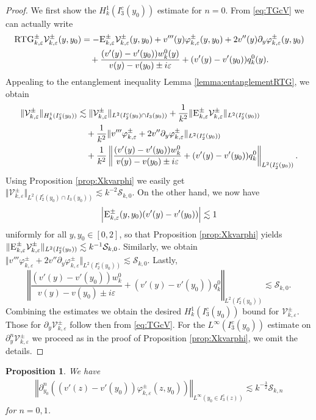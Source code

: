 \documentclass[11pt,reqno]{amsproc}
\newtheorem{proposition}{Proposition}[section]
\theoremstyle{definition}
\numberwithin{equation}{section}
\newcommand{\cS}{{\mathcal S}}
\newcommand{\cV}{{\mathcal{V}}}
\newcommand{\ep}{\varepsilon}
\begin{document}
\begin{proof}
We first show the $H_k^1(I_3^c(y_0))$ estimate for $n=0$. From \eqref{eq:TGcV} we can actually write
\begin{align*}
\textsc{RTG}_{k,\ep}^\pm \cV_{k,\ep}^\pm(y,y_0) &= - \textsc{E}_{k,\ep}^\pm \cV_{k,\ep}^\pm(y,y_0) + v'''(y)\varphi_{k,\ep}^\pm(y,y_0) + 2 v''(y) \partial_y\varphi_{k,\ep}^\pm(y,y_0) \\
&\quad+ \frac{(v'(y) - v'(y_0)) w_k^0(y)}{v(y) - v(y_0) \pm i\ep} + (v'(y) - v'(y_0)) q_k^0(y).
\end{align*}
Appealing to the entanglement inequality Lemma \ref{lemma:entanglementRTG}, we obtain
\begin{align*}
 \Vert \cV_{k,\ep}^\pm \Vert_{H_k^1(I_3^c(y_0))} &\lesssim \Vert \cV_{k,\ep}^\pm \Vert_{L^2(I_2^c(y_0)\cap I_3(y_0))} + \frac{1}{k^2}\Vert \textsc{E}_{k,\ep}^\pm \cV_{k,\ep}^\pm \Vert_{L^2(I_2^c(y_0))}\\
 &\quad + \frac{1}{k^2}\Vert v'''\varphi_{k,\ep}^\pm + 2 v'' \partial_y\varphi_{k,\ep}^\pm \Vert_{L^2(I_2^c(y_0))} \\
 &\quad + \frac{1}{k^2}\left \Vert \frac{(v'(y) - v'(y_0)) w_k^0}{v(y) - v(y_0) \pm i\ep} + (v'(y) - v'(y_0)) q_k^0\right\Vert_{L^2(I_2^c(y_0))}.
\end{align*}
Using Proposition \ref{prop:Xkvarphi} we easily get $\Vert \cV_{k,\ep}^\pm \Vert_{L^2(I_2^c(y_0)\cap I_3(y_0))} \lesssim k^{-2}\cS_{k,0}$. On the other hand, we now have
\begin{align*}
\left| \textsc{E}_{k,\ep}^\pm(y,y_0)(v'(y) - v'(y_0) ) \right| \lesssim 1
\end{align*}
uniformly for all $y, y_0\in[0,2]$, so that Proposition \ref{prop:Xkvarphi} yields $\Vert \textsc{E}_{k,\ep}^\pm \cV_{k,\ep}^\pm \Vert_{L^2(I_2^c(y_0))} \lesssim k^{-1}\cS_{k,0}$. Similarly, we obtain $\Vert v'''\varphi_{k,\ep}^\pm + 2 v'' \partial_y\varphi_{k,\ep}^\pm \Vert_{L^2(I_2^c(y_0))} \lesssim \cS_{k,0}$. Lastly, 
$$\left \Vert \frac{(v'(y) - v'(y_0)) w_k^0}{v(y) - v(y_0) \pm i\ep} + (v'(y) - v'(y_0)) q_k^0\right\Vert_{L^2(I_2^c(y_0))} \lesssim \cS_{k,0}.$$ 
Combining the estimates we obtain the desired $H_{k}^1(I_3^c(y_0))$ bound for $\cV_{k,\ep}^\pm$. Those for $\partial_y\cV_{k,\ep}^\pm$ follow then from \eqref{eq:TGcV}. For the $L^\infty(I_3^c(y_0))$ estimate on $\partial_y^n\cV_{k,\ep}^\pm$ we proceed as in the proof of Proposition \ref{prop:Xkvarphi}, we omit the details.
\end{proof}


\begin{proposition}\label{prop:LinfpynotcV}
We have
\begin{align*}
\left \Vert \partial_{y_0}^n\left( (v'(z) - v'(y_0)) \varphi_{k,\ep}^\pm(z,y_0) \right) \right\Vert_{L^\infty(y_0\in I_3^c(z))}  \lesssim k^{-\frac32}\cS_{k,n}
\end{align*}
for $n=0,1$.
\end{proposition}
\end{document}
